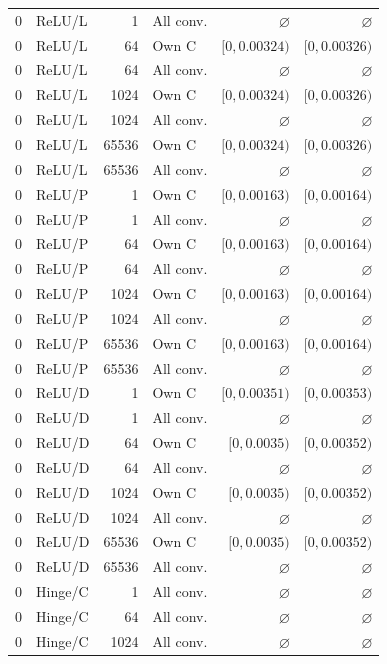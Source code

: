 \begin{longtable}{llrlrr}
0 & ReLU/L & 1 & All conv. & $\varnothing$ & $\varnothing$ \\
0 & ReLU/L & 64 & Own C & $[0, 0.00324)$ & $[0, 0.00326)$ \\
0 & ReLU/L & 64 & All conv. & $\varnothing$ & $\varnothing$ \\
0 & ReLU/L & 1024 & Own C & $[0, 0.00324)$ & $[0, 0.00326)$ \\
0 & ReLU/L & 1024 & All conv. & $\varnothing$ & $\varnothing$ \\
0 & ReLU/L & 65536 & Own C & $[0, 0.00324)$ & $[0, 0.00326)$ \\
0 & ReLU/L & 65536 & All conv. & $\varnothing$ & $\varnothing$ \\
0 & ReLU/P & 1 & Own C & $[0, 0.00163)$ & $[0, 0.00164)$ \\
0 & ReLU/P & 1 & All conv. & $\varnothing$ & $\varnothing$ \\
0 & ReLU/P & 64 & Own C & $[0, 0.00163)$ & $[0, 0.00164)$ \\
0 & ReLU/P & 64 & All conv. & $\varnothing$ & $\varnothing$ \\
0 & ReLU/P & 1024 & Own C & $[0, 0.00163)$ & $[0, 0.00164)$ \\
0 & ReLU/P & 1024 & All conv. & $\varnothing$ & $\varnothing$ \\
0 & ReLU/P & 65536 & Own C & $[0, 0.00163)$ & $[0, 0.00164)$ \\
0 & ReLU/P & 65536 & All conv. & $\varnothing$ & $\varnothing$ \\
0 & ReLU/D & 1 & Own C & $[0, 0.00351)$ & $[0, 0.00353)$ \\
0 & ReLU/D & 1 & All conv. & $\varnothing$ & $\varnothing$ \\
0 & ReLU/D & 64 & Own C & $[0, 0.0035)$ & $[0, 0.00352)$ \\
0 & ReLU/D & 64 & All conv. & $\varnothing$ & $\varnothing$ \\
0 & ReLU/D & 1024 & Own C & $[0, 0.0035)$ & $[0, 0.00352)$ \\
0 & ReLU/D & 1024 & All conv. & $\varnothing$ & $\varnothing$ \\
0 & ReLU/D & 65536 & Own C & $[0, 0.0035)$ & $[0, 0.00352)$ \\
0 & ReLU/D & 65536 & All conv. & $\varnothing$ & $\varnothing$ \\
0 & Hinge/C & 1 & All conv. & $\varnothing$ & $\varnothing$ \\
0 & Hinge/C & 64 & All conv. & $\varnothing$ & $\varnothing$ \\
0 & Hinge/C & 1024 & All conv. & $\varnothing$ & $\varnothing$ \\

\end{longtable}

